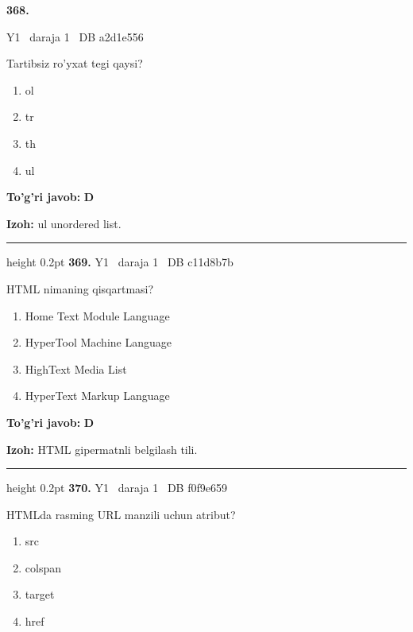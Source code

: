 \documentclass[10pt,a4paper,oneside]{article}
\begin{document}
\hypertarget{q368}{\textbf{\color{ink}368.}}  {\color{muted}\scriptsize Y1 \textbullet\ daraja 1 \textbullet\ DB a2d1e556}
\par
Tartibsiz ro'yxat tegi qaysi?
\begin{enumerate}[label=\Alph*),leftmargin=9mm]
\item ol
\item tr
\item th
\item ul
\end{enumerate}
\begin{tcolorbox}[enhanced,breakable,colback=teal!4,colframe=teal!45!black,boxrule=0.45pt,arc=1.2mm,left=2.8mm,right=2.8mm,top=2mm,bottom=2mm,before skip=2mm,after skip=2mm]
\textbf{\color{teal}To'g'ri javob:} \textbf{D}
\par\smallskip
\textbf{Izoh:} ul unordered list.
\end{tcolorbox}
\vspace{2mm}\hrule height 0.2pt \vspace{4mm}
\hypertarget{q369}{\textbf{\color{ink}369.}}  {\color{muted}\scriptsize Y1 \textbullet\ daraja 1 \textbullet\ DB c11d8b7b}
\par
HTML nimaning qisqartmasi?
\begin{enumerate}[label=\Alph*),leftmargin=9mm]
\item Home Text Module Language
\item HyperTool Machine Language
\item HighText Media List
\item HyperText Markup Language
\end{enumerate}
\begin{tcolorbox}[enhanced,breakable,colback=teal!4,colframe=teal!45!black,boxrule=0.45pt,arc=1.2mm,left=2.8mm,right=2.8mm,top=2mm,bottom=2mm,before skip=2mm,after skip=2mm]
\textbf{\color{teal}To'g'ri javob:} \textbf{D}
\par\smallskip
\textbf{Izoh:} HTML gipermatnli belgilash tili.
\end{tcolorbox}
\vspace{2mm}\hrule height 0.2pt \vspace{4mm}
\hypertarget{q370}{\textbf{\color{ink}370.}}  {\color{muted}\scriptsize Y1 \textbullet\ daraja 1 \textbullet\ DB f0f9e659}
\par
HTMLda rasming URL manzili uchun atribut?
\begin{enumerate}[label=\Alph*),leftmargin=9mm]
\item src
\item colspan
\item target
\item href
\end{enumerate}
\end{document}
